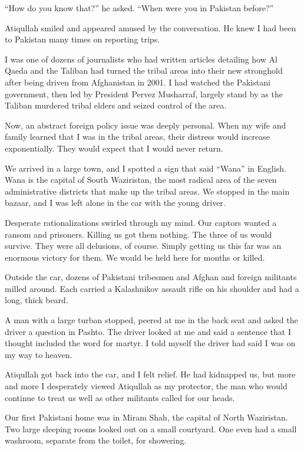 ﻿\documentclass[12pt]{article}
\begin{document}
``How do you know that?'' he asked. ``When were you in Pakistan before?''

Atiqullah smiled and appeared amused by the conversation. He knew I had been to Pakistan many times
on reporting trips.

I was one of dozens of journalists who had written articles detailing how Al Qaeda and the Taliban
had turned the tribal areas into their new stronghold after being driven from Afghanistan in 2001. I
had watched the Pakistani government, then led by President Pervez Musharraf, largely stand by as
the Taliban murdered tribal elders and seized control of the area.

Now, an abstract foreign policy issue was deeply personal. When my wife and family learned that I
was in the tribal areas, their distress would increase exponentially. They would expect that I would
never return.

We arrived in a large town, and I spotted a sign that said ``Wana'' in English. Wana is the capital
of South Waziristan, the most radical area of the seven administrative districts that make up the
tribal areas. We stopped in the main bazaar, and I was left alone in the car with the young driver.

Desperate rationalizations swirled through my mind. Our captors wanted a ransom and prisoners.
Killing us got them nothing. The three of us would survive. They were all delusions, of course.
Simply getting us this far was an enormous victory for them. We would be held here for months or
killed.

Outside the car, dozens of Pakistani tribesmen and Afghan and foreign militants milled around. Each
carried a Kalashnikov assault rifle on his shoulder and had a long, thick beard.

A man with a large turban stopped, peered at me in the back seat and asked the driver a question in
Pashto. The driver looked at me and said a sentence that I thought included the word for martyr. I
told myself the driver had said I was on my way to heaven.

Atiqullah got back into the car, and I felt relief. He had kidnapped us, but more and more I
desperately viewed Atiqullah as my protector, the man who would continue to treat us well as other
militants called for our heads.

Our first Pakistani home was in Miram Shah, the capital of North Waziristan. Two large sleeping
rooms looked out on a small courtyard. One even had a small washroom, separate from the toilet, for
showering.
\end{document}
